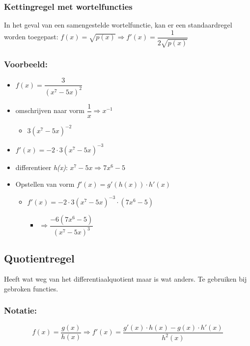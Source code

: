 \documentclass[11pt]{article}
\begin{document}
\subsubsection{Kettingregel met wortelfuncties}
\label{sec:org9766b24}
In het geval van een samengestelde wortelfunctie, kan er een standaardregel worden toegepast:
\(f(x) = \sqrt{p(x)} \Rightarrow f'(x) = \dfrac{1}{2\sqrt{p(x)}}\)
\subsubsection{Voorbeeld:}
\label{sec:org201ee68}
\begin{itemize}
\item \(f(x) = \dfrac{3}{(x^{7}-5x)^{2}}\)
\item omschrijven naar vorm \(\dfrac{1}{x} \Rightarrow x^{-1}\)
\begin{itemize}
\item \(3(x^{7}-5x)^{-2}\)
\end{itemize}
\item \(f'(x) = -2 \cdot 3(x^{7}-5x)^{-3}\)
\item differentieer \textit{h(x)}: \(x^{7}-5x \Rightarrow 7x^{6}-5\)
\item Opstellen van vorm \(f'(x) = g'(h(x)) \cdot h'(x)\)
\begin{itemize}
\item \(f'(x) = -2 \cdot 3(x^{7}-5x)^{-3} \cdot (7x^{6}-5)\)
\begin{itemize}
\item \(\Rightarrow \dfrac{-6(7x^{6}-5)}{(x^{7}-5x)^{3}}\)
\end{itemize}
\end{itemize}
\end{itemize}




\subsection{Quotientregel}
\label{sec:orgd67cdfa}
Heeft wat weg van het differentiaalquotient maar is wat anders. Te gebruiken bij gebroken functies. 
\subsubsection{Notatie:}
\label{sec:org6ec0c3c}
\begin{equation}
f(x) = \dfrac{g(x)}{h(x)} \Rightarrow f'(x) = \dfrac{g'(x) \cdot h(x) - g(x) \cdot h'(x)}{h^{2}(x)}
\end{equation}
\end{document}
